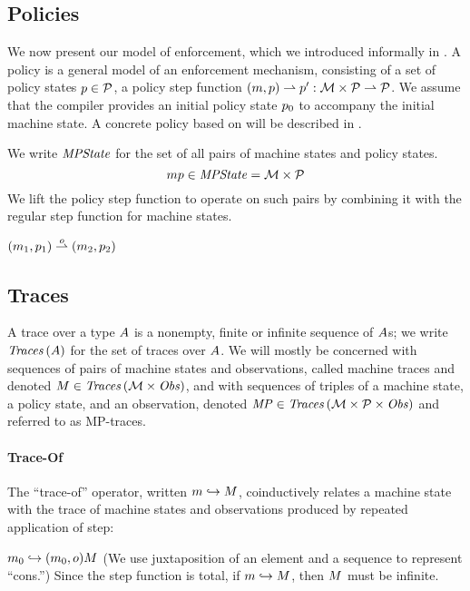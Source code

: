 \documentclass[acmsmall,review,anonymous]{acmart}\settopmatter{printfolios=true,printccs=false,printacmref=false}
\begin{document}
\subsection{Policies}

We now present our model of enforcement, which we introduced
informally in .  A policy is a general model of an
enforcement mechanism, consisting of a set of policy states \(p \in
\mathcal{P}\), a policy step function \((m, p) \rightharpoonup p' :
{\mathcal M} \times \mathcal{P} \rightharpoonup \mathcal{P}\). We assume that the
compiler provides an initial policy state $p_0$ to accompany 
the initial machine state.
%
A concrete policy based on \citet{DBLP:conf/sp/RoesslerD18} will be described in
.

We write $\mathit{MPState}$ for the set of all pairs of machine states and policy
states.
%
\[mp \in \mathit{MPState} = {\mathcal M} \times \mathcal{P}\]
%
We lift the policy step function to operate on such pairs
by combining it with the regular step function for machine states.

            {\((m_1,p_1) \overset{o}{\rightharpoonup}
               (m_2,p_2)\)}


\subsection{Traces}

A trace over a type $A$ is a nonempty, finite or infinite sequence of
$A$s; we write $\mathit{Traces}\,(A)$ for the set of traces over
$A$. We will mostly be concerned with sequences of pairs of
machine states
and observations, called machine traces and denoted $M \in \mathit{Traces}\,({\mathcal M} \times \mathit{Obs})$,
and with sequences of triples of a machine state, a policy state, and an
observation, denoted $\mathit{MP} \in \mathit{Traces}\,({\mathcal M} \times \mathcal{P} \times \mathit{Obs})$ and referred to as MP-traces.

\paragraph*{Trace-Of}

The ``trace-of'' operator, written \(m \hookrightarrow M\),
coinductively relates a machine state with the trace of machine states
and observations produced by repeated application of step:

            {\(m_0 \hookrightarrow (m_0,o) M\)}%
%
\noindent
(We use juxtaposition of an element and a sequence to represent ``cons.'')
Since the step function is total, if \(m \hookrightarrow M\),
then \(M\) must be infinite.
\end{document}
